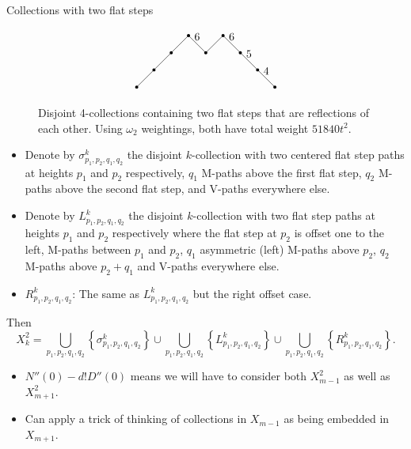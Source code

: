\documentclass[12pt]{beamer}
\begin{document}
\begin{frame}[allowframebreaks]{Collections with two flat steps}
\begin{figure}
\begin{equation*}
\begin{tikzpicture}[scale=0.55]
	\node at (0,4) [circle, fill, inner sep=1pt]{};
	\node at (1,5) [circle, fill, inner sep=1pt]{};
	\node at (2,6) [circle, fill, inner sep=1pt]{};
	\node at (3,7) [circle, fill, inner sep=1pt]{};
	\node at (4,6) [circle, fill, inner sep=1pt]{};
	\node at (5,7) [circle, fill, inner sep=1pt]{};
	\node at (6,6) [circle, fill, inner sep=1pt]{};
	\node at (7,5) [circle, fill, inner sep=1pt]{};
	\node at (8,4) [circle, fill, inner sep=1pt]{};
	\draw (0,4) -- (3,7);
	\draw (3,7) -- node[above] {6} (4,6);
	\draw (4,6) -- (5,7);
	\draw (5,7) -- node[above] {6} (6,6);
	\draw (6,6) -- node[above] {5} (7,5);
	\draw (7,5) -- node[above] {4} (8,4);
\end{tikzpicture}
\end{equation*}
\caption{\label{fig:asymMpath} Disjoint 4-collections containing two flat steps that are reflections of each other. Using $\omega_2$ weightings, both have total weight $51840t^2$.}
\end{figure}

\framebreak

\begin{itemize}
\item Denote by $\sigma^k_{p_1,p_2,q_1,q_2}$ the disjoint $k$-collection with two centered flat step paths at heights $p_1$ and $p_2$ respectively, $q_1$ M-paths above the first flat step, $q_2$ M-paths above the second flat step, and V-paths everywhere else.
\item Denote by $L^k_{p_1,p_2,q_1,q_2}$ the disjoint $k$-collection with two flat step paths at heights $p_1$ and $p_2$ respectively where the flat step at $p_2$ is offset one to the left, M-paths between $p_1$ and $p_2$, $q_1$ asymmetric (left) M-paths above $p_2$, $q_2$ M-paths above $p_2+q_1$ and V-paths everywhere else.
\item $R^k_{p_1,p_2,q_1,q_2}$: The same as $L^k_{p_1,p_2,q_1,q_2}$ but the right offset case.
\end{itemize}
Then
\small
\begin{equation*}
X_k^2 = \bigcup\limits_{p_1,p_2,q_1,q_2}\left\{ \sigma_{p_1,p_2,q_1,q_2}^k \right\} \cup \bigcup\limits_{p_1,p_2,q_1,q_2}\left\{ L_{p_1,p_2,q_1,q_2}^k \right\} \cup \bigcup\limits_{p_1,p_2,q_1,q_2}\left\{ R_{p_1,p_2,q_1,q_2}^k \right\}.
\end{equation*}
\normalsize

\framebreak

\begin{itemize}
\item $N''(0)-d!D''(0)$ means we will have to consider both $X_{m-1}^2$ as well as $X_{m+1}^2$.
\item Can apply a trick of thinking of collections in $X_{m-1}$ as being embedded in $X_{m+1}$.
\end{itemize}


\end{frame}
\end{document}
